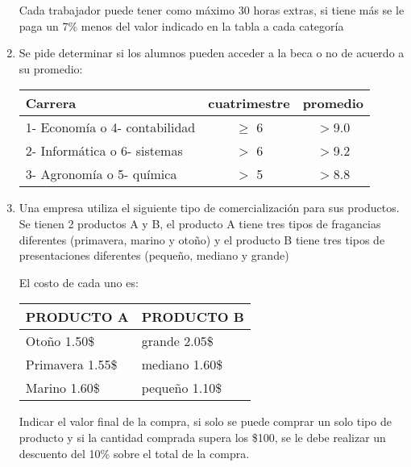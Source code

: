 \begin{enumerate}[resume]
	Cada trabajador puede tener como máximo 30 horas extras, si tiene más se le paga un 7\% menos del valor indicado en la tabla a cada categoría
	
	\item Se pide determinar si los alumnos pueden acceder a la beca o no de acuerdo a su promedio:
	 \begin{table}[H]
	      \begin{center}
	       \begin{tabular}{l|c|c}
	              Carrera                   &               cuatrimestre                  &      promedio \\
	         \toprule
	1- Economía o 4- contabilidad & $\geq$ 6 &  $>$9.0 \\
	2- Informática o 6- sistemas  & $>$ 6 &  $>$9.2 \\
	3- Agronomía o 5- química     & $>$ 5 &  $>$8.8 \\

		\end{tabular}
	   \end{center}
	  \end{table}
	  
	  \item Una empresa utiliza el siguiente tipo de comercialización para sus productos. Se tienen 2 productos A y B, el producto A tiene tres tipos de fragancias diferentes (primavera, marino y otoño) y el producto B tiene tres tipos de presentaciones diferentes (pequeño, mediano y grande)
	   
	  El costo de cada uno es:
	   \begin{table}[H]
	  	\begin{center}
	  	 \begin{tabular}{l|l}
			PRODUCTO    A  & PRODUCTO  B \\	
            \toprule
	           Otoño  1.50\$         &     grande 2.05\$ \\
	           Primavera 1.55\$      &     mediano  1.60\$ \\
	           Marino 1.60\$         &     pequeño  1.10\$ \\
	   	 \end{tabular}
	   	\end{center}
	   \end{table}
		   	 
	  Indicar el valor final de la compra, si solo se puede comprar un solo tipo de producto y si la cantidad comprada supera los \$100, se le debe realizar un descuento del 10\%  sobre el total de la compra.
	   

\end{enumerate}
